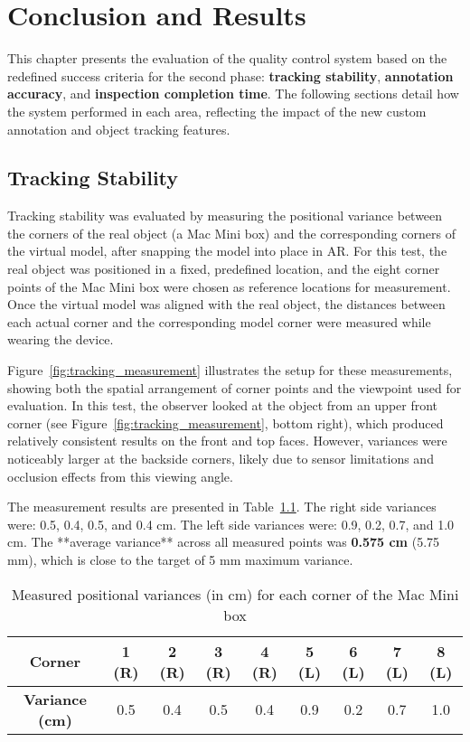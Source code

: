 \chapter{Conclusion and Results}

This chapter presents the evaluation of the quality control system based on the redefined success criteria for the second phase: \textbf{tracking stability}, \textbf{annotation accuracy}, and \textbf{inspection completion time}. The following sections detail how the system performed in each area, reflecting the impact of the new custom annotation and object tracking features.

\section{Tracking Stability}

Tracking stability was evaluated by measuring the positional variance between the corners of the real object (a Mac Mini box) and the corresponding corners of the virtual model, after snapping the model into place in AR. For this test, the real object was positioned in a fixed, predefined location, and the eight corner points of the Mac Mini box were chosen as reference locations for measurement. Once the virtual model was aligned with the real object, the distances between each actual corner and the corresponding model corner were measured while wearing the device.

Figure~\ref{fig:tracking_measurement} illustrates the setup for these measurements, showing both the spatial arrangement of corner points and the viewpoint used for evaluation. In this test, the observer looked at the object from an upper front corner (see Figure~\ref{fig:tracking_measurement}, bottom right), which produced relatively consistent results on the front and top faces. However, variances were noticeably larger at the backside corners, likely due to sensor limitations and occlusion effects from this viewing angle.

The measurement results are presented in Table~\ref{tab:tracking_variance}. The right side variances were: 0.5, 0.4, 0.5, and 0.4 cm. The left side variances were: 0.9, 0.2, 0.7, and 1.0 cm. The **average variance** across all measured points was \textbf{0.575 cm} (5.75 mm), which is close to the target of 5 mm maximum variance.

\begin{table}[h!]
    \centering
    \caption{Measured positional variances (in cm) for each corner of the Mac Mini box}
    \label{tab:tracking_variance}
    \begin{tabular}{|c|c|c|c|c|c|c|c|c|}
        \hline
        \textbf{Corner} & 1 (R) & 2 (R) & 3 (R) & 4 (R) & 5 (L) & 6 (L) & 7 (L) & 8 (L) \\
        \hline
        \textbf{Variance (cm)} & 0.5 & 0.4 & 0.5 & 0.4 & 0.9 & 0.2 & 0.7 & 1.0 \\
        \hline
    \end{tabular}
\end{table}


